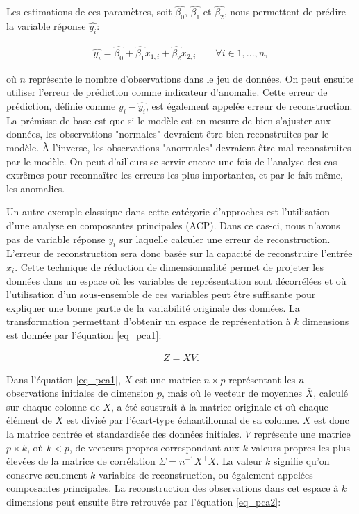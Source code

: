 Les estimations de ces paramètres, soit $\hat{\beta_0}$, $\hat{\beta_1}$ et $\hat{\beta_2}$, nous permettent de prédire la variable réponse $\hat{y_i}$: 

\begin{gather}  \label{eq_reghat}
\hat{y_i} = \hat{\beta_0} + \hat{\beta_{1}} x_{1,i} + \hat{\beta_2} x_{2,i} \qquad \forall i \in {1,...,n},
\end{gather}

où $n$ représente le nombre d'observations dans le jeu de données. On peut ensuite utiliser l'erreur de prédiction comme indicateur d'anomalie. Cette erreur de prédiction, définie comme $y_i - \hat{y_i}$, est également appelée erreur de reconstruction. La prémisse de base est que si le modèle est en mesure de bien s'ajuster aux données, les observations "normales" devraient être bien reconstruites par le modèle. À l'inverse, les observations "anormales" devraient être mal reconstruites par le modèle.  On peut d'ailleurs se servir encore une fois de l'analyse des cas extrêmes pour reconnaître les erreurs les plus importantes, et par le fait même, les anomalies.
 
Un autre exemple classique dans cette catégorie d'approches est l'utilisation d'une analyse en composantes principales (ACP). Dans ce cas-ci, nous n'avons pas de variable réponse $y_i$ sur laquelle calculer une erreur de reconstruction. L'erreur de reconstruction sera donc basée sur la capacité de reconstruire l'entrée $x_i$. Cette technique de réduction de dimensionnalité permet de projeter les données dans un espace où les variables de représentation sont décorrélées et où l'utilisation d'un sous-ensemble de ces variables peut être suffisante pour expliquer une bonne partie de la variabilité originale des données. La transformation permettant d'obtenir un espace de représentation à $k$ dimensions est donnée par l'équation \ref{eq_pca1}:
 
 \begin{gather}  \label{eq_pca1}
 Z = XV.
 \end{gather}
 
Dans l'équation \ref{eq_pca1}, $X$ est une matrice $n \times p$ représentant les $n$  observations initiales de dimension $p$, mais où le vecteur de moyennes $\bar{X}$, calculé sur chaque colonne de $X$, a été soustrait à la matrice originale et où chaque élément de $X$ est divisé par l'écart-type échantillonnal de sa colonne. $X$ est donc la matrice centrée et standardisée des données initiales. $V$ représente une matrice $p \times k$, où $k < p$, de  vecteurs propres correspondant aux $k$ valeurs propres les plus élevées de la matrice de corrélation $\Sigma = n^{-1}X^\top X$. La valeur $k$ signifie qu'on conserve seulement $k$ variables de reconstruction, ou également appelées composantes principales. La reconstruction des observations dans cet espace à $k$ dimensions peut ensuite être retrouvée par l'équation \ref{eq_pca2}:
 
